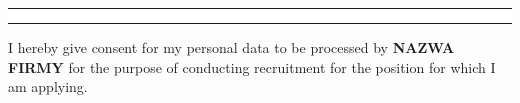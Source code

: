 \documentclass[a4paper,12pt]{article}
\newcommand{\firma}{NAZWA FIRMY}
\begin{document}
\vspace{-0.5em}
\textcolor{red}{\rule{15cm}{1pt}}










\begin{center}
\textcolor{red}{\rule{15cm}{1pt}}
\end{center}

\begin{center}
    \small{I hereby give consent for my personal data to be processed by \textbf{\firma} for the purpose of conducting recruitment for the position for which I am applying.}
\end{center}
\end{document}
